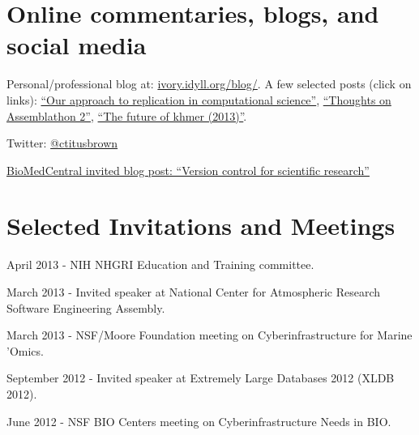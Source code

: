 \documentclass[margin,line]{resume}
\begin{document}
\begin{resume}
\section{\mysidestyle Online commentaries, blogs, and social media}

Personal/professional blog at: \href{http://ivory.idyll.org/blog/}{ivory.idyll.org/blog/}.  A few selected posts (click on links): \href{http://ivory.idyll.org/blog/replication-i.html}{``Our approach to replication in computational science''}, \href{http://ivory.idyll.org/blog/thoughts-on-assemblathon-2.html}{``Thoughts on Assemblathon 2''}, \href{http://ivory.idyll.org/blog/the-future-of-khmer-2013-version.html}{``The future of khmer (2013)''}.

Twitter: \href{http://twitter.com/ctitusbrown}{@ctitusbrown}

\href{http://blogs.biomedcentral.com/bmcblog/2013/02/28/version-control-for-scientific-research/}{BioMedCentral invited blog post: ``Version control for scientific research''}

\section{\mysidestyle Selected Invitations and Meetings}

\begin{list1}

\item[] April 2013 - NIH NHGRI Education and Training committee.
\item[] March 2013 - Invited speaker at National Center for Atmospheric Research Software Engineering Assembly.
\item[] March 2013 - NSF/Moore Foundation meeting on Cyberinfrastructure for Marine 'Omics.
\item[] September 2012 - Invited speaker at Extremely Large Databases 2012 (XLDB 2012).
\item[] June 2012 - NSF BIO Centers meeting on Cyberinfrastructure Needs in BIO.

\end{list1}

\end{resume}
\end{document}
